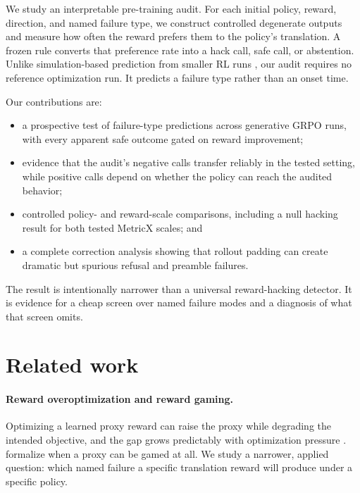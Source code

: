 \documentclass[11pt]{article}
\begin{document}
We study an interpretable pre-training audit.  For each initial policy, reward,
direction, and named failure type, we construct controlled degenerate outputs
and measure how often the reward prefers them to the policy's translation.  A
frozen rule converts that preference rate into a hack call, safe call, or
abstention.  Unlike simulation-based prediction from smaller RL runs
\citep{deng-etal-2026-simhack}, our audit requires no reference optimization
run.  It predicts a failure type rather than an onset time.

Our contributions are:
\begin{itemize}
  \item a prospective test of failure-type predictions across \ScaleRuns{}
        generative GRPO runs, with every apparent safe outcome gated on reward
        improvement;
  \item evidence that the audit's negative calls transfer reliably in the
        tested setting, while positive calls depend on whether the policy can
        reach the audited behavior;
  \item controlled policy- and reward-scale comparisons, including a null
        hacking result for both tested MetricX scales; and
  \item a complete correction analysis showing that rollout padding can create
        dramatic but spurious refusal and preamble failures.
\end{itemize}

The result is intentionally narrower than a universal reward-hacking detector.
It is evidence for a cheap screen over named failure modes and a diagnosis of
what that screen omits.

\section{Related work}

\paragraph{Reward overoptimization and reward gaming.}
Optimizing a learned proxy reward can raise the proxy while degrading the
intended objective, and the gap grows predictably with optimization pressure
\citep{gao-etal-2023-scaling}.  \citet{skalse-etal-2022-defining} formalize when
a proxy can be gamed at all.  We study a narrower, applied question: which
named failure a specific translation reward will produce under a specific
policy.
\end{document}
